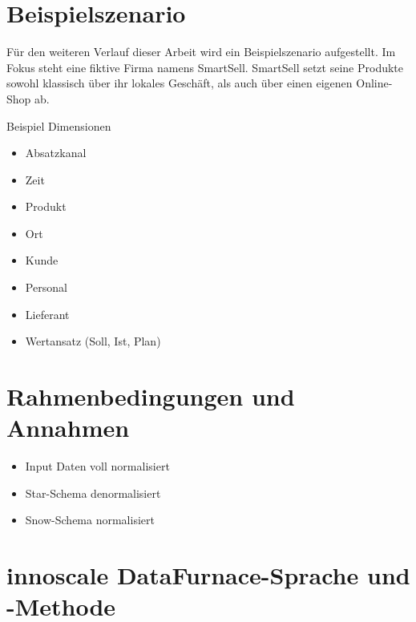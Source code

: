 \documentclass[
  language=german, %
  type=bachelor%
]{isthesis}
\begin{document}
\begin{content}
  \section{Beispielszenario}
  Für den weiteren Verlauf dieser Arbeit wird ein Beispielszenario aufgestellt. Im
  Fokus steht eine fiktive Firma namens SmartSell. SmartSell setzt seine
  Produkte sowohl klassisch über ihr lokales Geschäft, als auch über einen
  eigenen Online-Shop ab.

  Beispiel Dimensionen
  \begin{itemize}
    \item Absatzkanal
    \item Zeit
    \item Produkt
    \item Ort
    \item Kunde
    \item Personal
    \item Lieferant
    \item Wertansatz (Soll, Ist, Plan)
  \end{itemize}

  \section{Rahmenbedingungen und Annahmen}
  \begin{itemize}
    \item Input Daten voll normalisiert
    \item Star-Schema denormalisiert
    \item Snow-Schema normalisiert
  \end{itemize}

  \section{innoscale DataFurnace-Sprache und -Methode}


\end{content}
\end{document}
